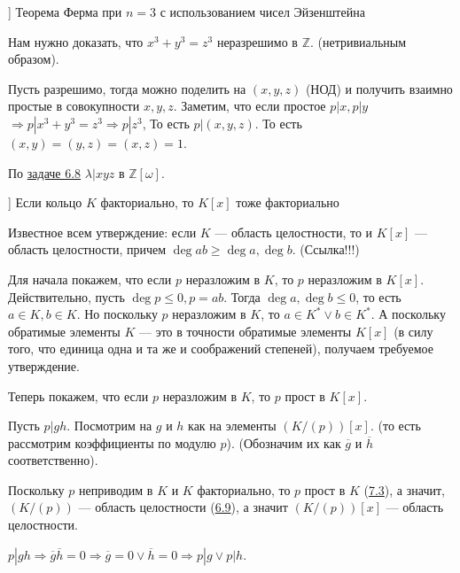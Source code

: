 

\date{}



\begin{problem}[1{(d1)}[Каргальцев]]
Теорема Ферма при $n = 3$ с использованием чисел
Эйзенштейна

Нам нужно доказать, что $x^3 + y^3 = z^3$ неразрешимо в $\mathbb{Z}$.
(нетривиальным образом).
\end{problem}

Пусть разрешимо, тогда можно поделить на \((x, y, z)\) (НОД) и получить взаимно простые в совокупности \(x, y, z\). Заметим, что если простое \(p | x, p | y\) \(\Rightarrow p | x^3 + y^3 = z^3 \Rightarrow p | z^3\), То есть \(p | (x, y, z)\). То есть \((x, y) = (y, z) = (x, z) = 1\).

По \hyperlink{6.8}{задаче 6.8} \(\lambda | xyz\) в \(\mathbb{Z}[\omega]\).

\begin{problem}[5 [Каргальцев]]
Если кольцо $K$ факториально, то $K[x]$ тоже факториально
\end{problem}

Известное всем утверждение: если \(K\) --- область целостности, то и \(K[x]\) --- область целостности, причем \(\deg ab \geqslant \deg a, \deg b\). (Ссылка!!!)

Для начала покажем, что если \(p\) неразложим в \(K\), то \(p\) неразложим в \(K[x]\). Действительно, пусть \(\deg p \leqslant 0, p = ab\). Тогда \(\deg a, \deg b \leqslant 0\), то есть \(a \in K, b \in K\). Но поскольку \(p\) неразложим в \(K\), то \(a \in K^* \lor b \in K^*\). А поскольку обратимые элементы \(K\) --- это в точности обратимые элементы \(K[x]\) (в силу того, что единица одна и та же и соображений степеней), получаем требуемое утверждение.

Теперь покажем, что если \(p\) неразложим в \(K\), то \(p\) прост в \(K[x]\).

Пусть \(p | gh\). Посмотрим на \(g\) и \(h\) как на элементы \((K / (p))[x]\). (то есть рассмотрим коэффициенты по модулю \(p\)). (Обозначим их как \(\overline{g}\) и \(\overline{h}\) соответственно).

Поскольку \(p\) неприводим в \(K\) и \(K\) факториально, то \(p\) прост в \(K\) (\hyperlink{7.3}{7.3}), а значит, \((K / (p))\) --- область целостности (\hyperlink{6.9}{6.9}), а значит \((K / (p))[x]\) --- область целостности.

\(p | gh \Rightarrow \overline{g}\overline{h} = 0 \Rightarrow \overline{g} = 0 \lor \overline{h} = 0 \Rightarrow p | g \lor p | h\).

